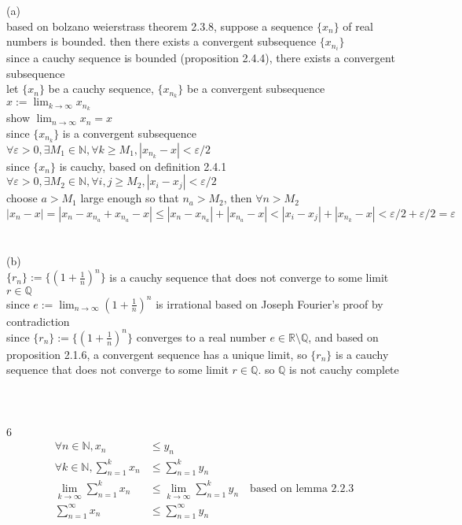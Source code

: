 \documentclass[12pt, border = 4pt, multi]{article} %
\begin{document}
(a)\\
based on bolzano weierstrass theorem 2.3.8, suppose a sequence $\{x_n\}$ of real numbers is bounded. then there exists a convergent subsequence $\{x_{n_i}\}$\\
since a cauchy sequence is bounded (proposition 2.4.4), there exists a convergent subsequence\\
let $\{x_n\}$ be a cauchy sequence, $\{x_{n_k}\}$ be a convergent subsequence\\ $x := \lim_{k \rightarrow \infty} x_{n_k}$\\
show $\lim_{n \rightarrow \infty} x_n = x$\\
since $\{x_{n_k}\}$ is a convergent subsequence\\
$\forall \varepsilon > 0, \exists M_1 \in \mathbb{N}, \forall k \geq M_1, |x_{n_k} - x| < \varepsilon / 2$\\
since $\{x_n\}$ is cauchy, based on definition 2.4.1\\
$\forall \varepsilon > 0, \exists M_2 \in \mathbb{N}, \forall i, j \geq M_2, |x_i - x_j| < \varepsilon / 2$\\
choose $a > M_1$ large enough so that $n_a > M_2$, then $\forall n > M_2$\\
$|x_n - x| = |x_n - x_{n_a} + x_{n_a} - x| \leq |x_n - x_{n_a}| + |x_{n_a} - x| < |x_i - x_j| + |x_{n_k} - x| < \varepsilon / 2 + \varepsilon / 2 = \varepsilon$\\
\\
\\
(b)\\
$\{r_n\} := \{(1 + \frac{1}{n}) ^ n\}$ is a cauchy sequence that does not converge to some limit $r \in \mathbb{Q}$\\
since $e := \lim_{n \rightarrow \infty} (1 + \frac{1}{n}) ^ n$ is irrational based on Joseph Fourier's proof by contradiction\\
since $\{r_n\} := \{(1 + \frac{1}{n}) ^ n\}$ converges to a  real number $e \in \mathbb{R} \setminus \mathbb{Q}$, and based on proposition 2.1.6, a convergent sequence has a unique limit, so $\{r_n\}$ is a cauchy sequence that does not converge to some limit $r \in \mathbb{Q}$. so $\mathbb{Q}$ is not cauchy complete\\
\\
\\
\\
6
\begin{align*}
\forall n \in \mathbb{N}, x_n &\leq y_n\\
\forall k \in \mathbb{N}, \sum_{n = 1} ^ k x_n &\leq \sum_{n = 1} ^ k y_n\\
\lim_{k \rightarrow \infty} \sum_{n = 1} ^ k x_n &\leq \lim_{k \rightarrow \infty} \sum_{n = 1} ^ k y_n \quad\text{based on lemma 2.2.3}\\
\sum_{n = 1} ^ {\infty} x_n &\leq \sum_{n = 1} ^ {\infty} y_n\\
\end{align*}
\end{document}
